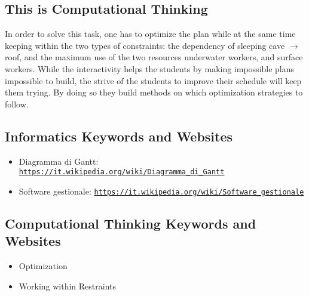 \documentclass[a4paper,11pt]{report}
\newcommand{\BrochureUrlText}[1]{\texttt{#1}}
\begin{document}
\subsection*{This is Computational Thinking}

In order to solve this task, one has to optimize the plan while at the same time keeping within the two types of constraints: the dependency of sleeping cave \ensuremath{\rightarrow} roof, and the maximum use of the two resources underwater workers, and surface workers. While the interactivity helps the students by making impossible plans impossible to build, the strive of the students to improve their schedule will keep them trying. By doing so they build methods on which optimization strategies to follow.


\subsection*{Informatics Keywords and Websites}

\begin{itemize}
  \item Diagramma di Gantt: \href{https://it.wikipedia.org/wiki/Diagramma_di_Gantt}{\BrochureUrlText{https://it.wikipedia.org/wiki/Diagramma\_di\_Gantt}}
  \item Software gestionale: \href{https://it.wikipedia.org/wiki/Software_gestionale}{\BrochureUrlText{https://it.wikipedia.org/wiki/Software\_gestionale}}
\end{itemize}


\subsection*{Computational Thinking Keywords and Websites}

\begin{itemize}
  \item Optimization
  \item Working within Restraints
\end{itemize}
\end{document}
